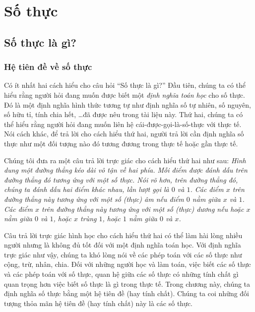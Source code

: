 \chapter{Số thực}

\section{Số thực là gì?}

\subsection{Hệ tiên đề về số thực}

Có ít nhất hai cách hiểu cho câu hỏi ``Số thực là gì?\@'' Đầu tiên, chúng ta có thể hiểu rằng người hỏi đang muốn được biết một \textit{định nghĩa toán học} cho số thực. Đó là một định nghĩa hình thức tương tự như định nghĩa số tự nhiên, số nguyên, số hữu tỉ, tính chia hết, \ldots đã được nêu trong tài liệu này. Thứ hai, chúng ta có thể hiểu rằng người hỏi đang muốn liên hệ cái-được-gọi-là-số-thực với thực tế. Nói cách khác, để trả lời cho cách hiểu thứ hai, người trả lời cần định nghĩa số thực như một đối tượng nào đó tương đương trong thực tế hoặc gần thực tế.

Chúng tôi đưa ra một câu trả lời trực giác cho cách hiểu thứ hai như sau: \textit{Hình dung một đường thẳng kéo dài vô tận về hai phía. Mỗi điểm được đánh dấu trên đường thẳng đó tương ứng với một số thực. Nói rõ hơn, trên đường thẳng đó, chúng ta đánh dấu hai điểm khác nhau, lần lượt gọi là $0$ và $1$. Các điểm $x$ trên đường thẳng này tương ứng với một số (thực) âm nếu điểm $0$ nằm giữa $x$ và $1$. Các điểm $x$ trên đường thẳng này tương ứng với một số (thực) dương nếu hoặc $x$ nằm giữa $0$ và $1$, hoặc $x$ trùng $1$, hoặc $1$ nằm giữa $0$ và $x$.}

Câu trả lời trực giác hình học cho cách hiểu thứ hai có thể làm hài lòng nhiều người nhưng là không đủ tốt đối với một định nghĩa toán học. Với định nghĩa trực giác như vậy, chúng ta khó lòng nói về các phép toán với các số thực như cộng, trừ, nhân, chia. Đối với những người học và làm toán, việc biết các số thực và các phép toán với số thực, quan hệ giữa các số thực có những tính chất gì quan trọng hơn việc biết số thực là gì trong thực tế. Trong chương này, chúng ta định nghĩa số thực bằng một hệ tiên đề (hay tính chất). Chúng ta coi những đối tượng thỏa mãn hệ tiên đề (hay tính chất) này là các số thực.

